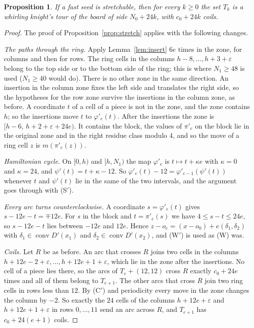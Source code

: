 \documentclass[11pt]{amsart}
\newtheorem{proposition}[theorem]{Proposition}
\theoremstyle{remark}
\begin{document}
\begin{proposition}\label{prop:fast}
If a fast seed is stretchable, then for every $k\ge0$ the set $T_k$ is a whirling knight's tour of the board of side
$N_0+24k$, with $c_0+24k$ coils.
\end{proposition}
\begin{proof}
The proof of Proposition~\ref{prop:stretch} applies with the following changes.

\emph{The paths through the ring.} Apply Lemma~\ref{lem:insert} $6e$ times in the zone, for columns and then for
rows. The ring cells in the columns $h-8,\dots,h+3+\varepsilon$ belong to the top side or to the bottom side of
the ring; this is where $N_1\ge48$ is used ($N_1\ge40$ would do). There is no other zone in the same direction. An
insertion in the column zone fixes the left side and translates the right side, so the hypotheses for the row zone
survive the insertions in the column zone, as before. A coordinate $t$ of a cell of a piece is not in the zone, and the zone
contains $h$; so the insertions move $t$ to $\varphi'_e(t)$. After the insertions the zone is
$[h-6,\,h+2+\varepsilon+24e)$. It contains the block, the values of $\pi'_e$ on the block lie in the original zone
and in the right residue class modulo $4$, and so the move of a ring cell $z$ is $m(\pi'_e(z))$.

\emph{Hamiltonian cycle.} On $[0,h)$ and $[h,N_1)$ the map $\varphi'_e$ is $t\mapsto t+\kappa e$ with $\kappa=0$
and $\kappa=24$, and $\psi'(t)=t+\kappa-12$. So $\varphi'_e(t)-12=\varphi'_{e-1}(\psi'(t))$ whenever $t$ and
$\psi'(t)$ lie in the same of the two intervals, and the argument goes through with (S$'$).

\emph{Every arc turns counterclockwise.} A coordinate $s=\varphi'_e(t)$ gives $s-12e-t=\mp12e$. For $s$ in the
block and $t=\pi'_e(s)$ we have $4\le s-t\le24e$, so $s-12e-t$ lies between $-12e$ and $12e$. Hence
$z-o_e=(x-o_0)+e(\delta_1,\delta_2)$ with $\delta_1\in\operatorname{conv}D'(x_1)$ and
$\delta_2\in\operatorname{conv}D'(x_2)$, and (W$'$) is used as (W) was.

\emph{Coils.} Let $R$ be as before. An arc that crosses $R$ joins two cells in the columns
$h+12e-2+\varepsilon,\dots,h+12e+1+\varepsilon$, which lie in the zone after the insertions. No cell of a piece lies
there, so the arcs of $T_e+(12,12)$ cross $R$ exactly $c_0+24e$ times and all of them belong to $T_{e+1}$. The other
arcs that cross $R$ join two ring cells in rows less than $12$. By (C$'$) and periodicity every move in the zone
changes the column by $-2$. So exactly the $24$ cells of the columns $h+12e+\varepsilon$ and
$h+12e+1+\varepsilon$ in rows $0,\dots,11$ send an arc across $R$, and $T_{e+1}$ has $c_0+24(e+1)$ coils.
\end{proof}
\end{document}
